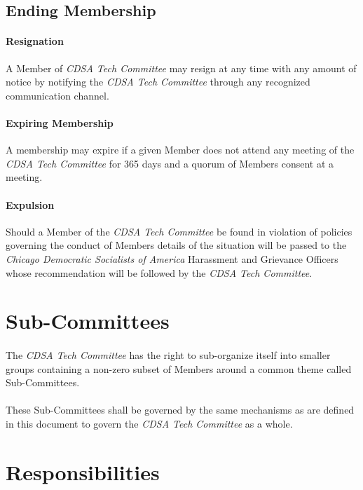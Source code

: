 \documentclass[12pt,letter,twocolumn,oneside,draft]{article}
\newcommand{\cname}{\emph{CDSA Tech Committee}}
\newcommand{\cdsa}{\emph{Chicago Democratic Socialists of America}}
\begin{document}
\subsection{Ending Membership}

\paragraph{Resignation}
A Member of \cname{} may resign at any time with any amount of notice by
notifying the \cname{} through any recognized communication channel.

\paragraph{Expiring Membership}
A membership may expire if a given Member does not attend any meeting of the
\cname{} for 365 days and a quorum of Members consent at a meeting.

\paragraph{Expulsion}
Should a Member of the \cname{} be found in violation of policies governing the
conduct of Members details of the situation will be passed to the \cdsa{}
Harassment and Grievance Officers whose recommendation will be followed by the
\cname{}.


\section{Sub-Committees}

\paragraph{}
The \cname{} has the right to sub-organize itself into smaller groups
containing a non-zero subset of Members around a common theme called
Sub-Committees.

\paragraph{}
These Sub-Committees shall be governed by the same mechanisms as are defined in
this document to govern the \cname{} as a whole.


\section{Responsibilities}
\end{document}
